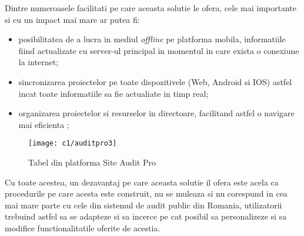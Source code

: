 	Dintre numeroasele facilitati pe care aceasta solutie le ofera, cele mai importante si cu un impact mai mare ar putea fi:
	\begin{itemize}
		\item posibilitatea de a lucra in mediul \textit{offline} pe platforma mobila, informatiile fiind actualizate cu server-ul principal in momentul in care exista o conexiune la internet;
		
		\item sincronizarea proiectelor pe toate dispozitivele (Web, Android si IOS) astfel incat toate informatiile sa fie actualiate in timp real;
		
		\item organizarea proiectelor si resurselor in directoare, facilitand astfel o navigare mai eficienta ;
	\end{itemize}
	\begin{figure}[h]
		\centering
		
		\texttt{[image: c1/auditpro3]}
		\caption{Tabel din platforma Site Audit Pro}
	\end{figure}
	
	Cu toate acestea, un dezavantaj pe care aceasta solutie il ofera este acela ca procedurile pe care acesta este construit, nu se muleaza si nu corespund in cea mai mare parte cu cele din sistemul de audit public din Romania, utilizatorii trebuind astfel sa se adapteze si sa incerce pe cat posibil sa personalizeze si sa modifice functionalitatile oferite de acestia.
	
	
	
	
